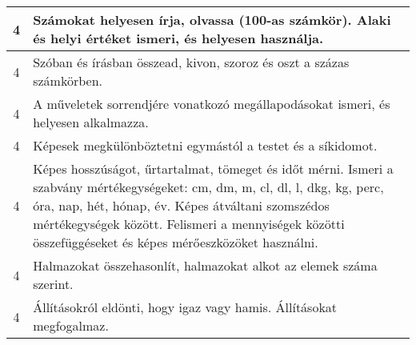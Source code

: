 \begin{longtable}{c | p{12cm} }
                                
                                          4 &  Számokat helyesen írja, olvassa (100-as számkör). Alaki és helyi értéket ismeri, és helyesen használja. \\ \hline
                                          4 &  Szóban és írásban összead, kivon, szoroz és oszt a százas számkörben. \\ \hline
                                          4 &  A műveletek sorrendjére vonatkozó megállapodásokat ismeri, és helyesen alkalmazza. \\ \hline
                                          4 &  Képesek megkülönböztetni egymástól a testet és a síkidomot. \\ \hline
                                          4 &  Képes hosszúságot, űrtartalmat, tömeget és időt mérni. Ismeri a szabvány mértékegységeket: cm, dm, m, cl, dl, l, dkg, kg, perc, óra, nap, hét, hónap, év. Képes átváltani szomszédos mértékegységek között. Felismeri a mennyiségek közötti összefüggéseket és képes mérőeszközöket használni. \\ \hline
                                          4 &  Halmazokat összehasonlít, halmazokat alkot az elemek száma szerint. \\ \hline
                                          4 &  Állításokról eldönti, hogy igaz vagy hamis. Állításokat megfogalmaz. \\ \hline
                                      
                        \end{longtable}
            \clearpage

